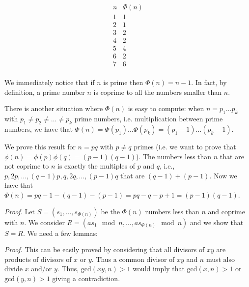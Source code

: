 $$\begin{array}{c|c}n & \Phi(n) \\ \hline 1 & 1\\2 & 1\\3 & 2\\4 & 2\\ 5&4\\ 6&2 \\ 7&6 \\ \end{array}$$

We immediately notice that if $n$ is prime then $\Phi(n) = n-1$. In fact, by definition, a prime number $n$ is coprime to all the numbers smaller than $n$. 

There is another situation where $\Phi(n)$ is easy to compute: when $n=p_1 \ldots p_k$ with $p_1 \neq p_2 \neq \ldots \neq p_k$ prime numbers, i.e. multiplication between prime numbers, we have that $\Phi(n) = \Phi(p_1) \ldots \Phi(p_k) = (p_1-1) \ldots (p_k-1)$.


We prove this result for $n = pq$ with $p\neq q$ primes (i.e. we want to prove that $\phi(n) = \phi(p) \phi(q) = (p-1)(q-1)$). The numbers less than $n$ that are not coprime to $n$ is exactly the multiples of $p$ and $q$, i.e., $p,2p,\ldots,(q-1)p,q,2q,\ldots,(p-1)q$ that are $(q-1)+(p-1)$. Now we have that $\Phi(n) = pq-1 - (q-1)-(p-1) = pq -q -p +1  = (p-1)(q-1)$.



\textit{Proof.} Let $S = (s_1, \ldots, s_{\Phi(n)})$ be the $\Phi(n)$ numbers less than $n$ and coprime with $n$. We consider $R = (a s_1 \mod n, \ldots, a s_{\Phi(n)} \mod n)$ and we show that $S = R$. We need a few lemmas:


\textit{Proof.} This can be easily proved by considering that all divisors of $xy$ are products of divisors of $x$ or $y$. Thus a common divisor of $xy$ and $n$ must also divide $x$ and/or $y$. Thus, $\text{gcd}(xy,n)>1$ would imply that $\text{gcd}(x,n)>1$ or $\text{gcd}(y,n)>1$ giving a contradiction.

